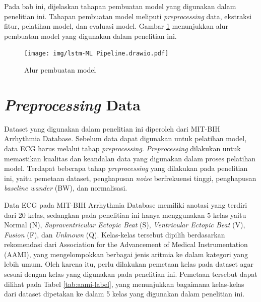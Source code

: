 






Pada bab ini, dijelaskan tahapan pembuatan model yang digunakan dalam penelitian ini. Tahapan pembuatan model meliputi \textit{preprocessing} data, ekstraksi fitur, pelatihan model, dan evaluasi model. Gambar \ref{fig:alur-model} menunjukkan alur pembuatan model yang digunakan dalam penelitian ini.

\begin{figure}[H]
  \begin{center}
    \texttt{[image: img/lstm-ML Pipeline.drawio.pdf]}
  \end{center}
  \caption{Alur pembuatan model}
  \label{fig:alur-model}
\end{figure}

\section{\emph{Preprocessing} Data}
\label{subsec: bab4-preprocessing-data}

Dataset yang digunakan dalam penelitian ini diperoleh dari MIT-BIH Arrhythmia Database.
Sebelum data dapat digunakan untuk pelatihan model, data ECG harus melalui tahap \textit{preprocessing}.
\textit{Preprocessing} dilakukan untuk memastikan kualitas dan keandalan data yang digunakan dalam proses pelatihan model. 
Terdapat beberapa tahap \textit{preprocessing} yang dilakukan pada penelitian ini, yaitu pemetaan dataset, penghapusan \textit{noise} berfrekuensi tinggi, penghapusan \textit{baseline wander} (BW), dan normalisasi.

Data ECG pada MIT-BIH Arrhythmia Database memiliki anotasi yang terdiri dari 20 kelas, sedangkan pada penelitian ini hanya menggunakan 5 kelas yaitu Normal (N), \textit{Supraventricular Ectopic Beat} (S), \textit{Ventricular Ectopic Beat} (V), \textit{Fusion} (F), dan \textit{Unknown} (Q).
Kelas-kelas tersebut dipilih berdasarkan rekomendasi dari Association for the Advancement of Medical Instrumentation (AAMI), yang mengelompokkan berbagai jenis aritmia ke dalam kategori yang lebih umum.
Oleh karena itu, perlu dilakukan pemetaan kelas pada dataset agar sesuai dengan kelas yang digunakan pada penelitian ini.
Pemetaan tersebut dapat dilihat pada Tabel \ref{tab:aami-label}, yang menunjukkan bagaimana kelas-kelas dari dataset dipetakan ke dalam 5 kelas yang digunakan dalam penelitian ini.

